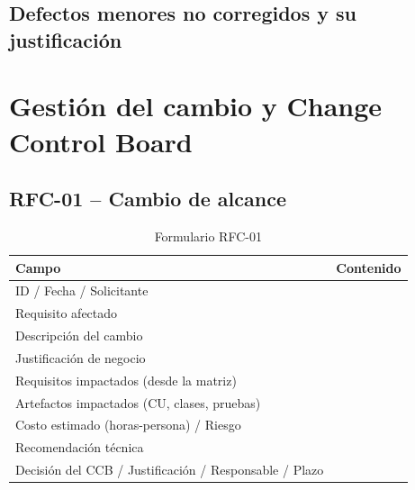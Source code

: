 \documentclass[journal,onecolumn]{IEEEtran}
\newcommand{\guia}[2]{%
	\begin{mdframed}[style=guia]
		\sloppy
		\noindent\textbf{Responsable: #1}\\[2pt]
		#2
	\end{mdframed}
}
\newif\ifguias
\let\guiaoriginal\guia
\renewcommand{\guia}[2]{\ifguias\guiaoriginal{#1}{#2}\fi}
\begin{document}
	\subsection{Defectos menores no corregidos y su justificación}
	
	\guia{Kevin (Integrante 2)}{%
		Obligatorio corregir el \textbf{100\,\% de los críticos y mayores}, con texto literal antes
		y después y referencia al requisito modificado. El texto «antes» se copia literalmente de
		\texttt{01\_ERS/ERS\_v1.0.tex}; el «después» es lo que quedará en \texttt{ERS\_v1.1.tex}.\\[3pt]
		Los defectos menores no corregidos deben quedar \textbf{justificados} en esta subsección
		--- defecto, motivo por el que no se corrige y momento previsto de tratamiento ---, no
		simplemente omitidos. Coordinar con Edson para que los cambios entren efectivamente en el
		ERS v1.1 del repositorio: una corrección declarada en el informe pero ausente del .tex es
		una incoherencia verificable.}
	
	\section{Gestión del cambio y Change Control Board}
	
	\guia{Todo el equipo -- peso 18\,\%}{%
		Las tres RFC deben ser de \textbf{naturaleza distinta}: una de alcance (nuevo requisito),
		una de calidad (modificación de un RNF) y una de restricción o normativa. Al menos una debe
		provenir de un conflicto real detectado en la PE2 o en la inspección del Paso~1.
		El campo «Requisitos impactados» se obtiene \textbf{recorriendo la matriz de trazabilidad},
		no estimando; el impacto estimado «a ojo» baja C3 a nivel 2.}
	
	\subsection{RFC-01 -- Cambio de alcance}
	
	\begin{table}[H]
		\centering
		\caption{Formulario RFC-01}
		\begin{tabular}{L{5.2cm} L{8.5cm}}
			\toprule
			\textbf{Campo} & \textbf{Contenido} \\
			\midrule
			ID / Fecha / Solicitante & \\
			Requisito afectado & \\
			Descripción del cambio & \\
			Justificación de negocio & \\
			Requisitos impactados (desde la matriz) & \\
			Artefactos impactados (CU, clases, pruebas) & \\
			Costo estimado (horas-persona) / Riesgo & \\
			Recomendación técnica & \\
			Decisión del CCB / Justificación / Responsable / Plazo & \\
			\bottomrule
		\end{tabular}
	\end{table}
	
\end{document}
